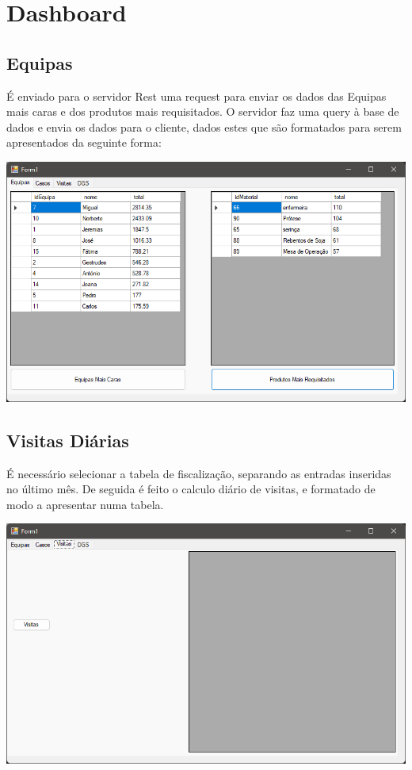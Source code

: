 \chapter{Dashboard}

\section{Equipas}
É enviado para o servidor Rest uma request para enviar os dados das Equipas mais caras e dos produtos mais requisitados. O servidor faz uma query à base de dados e envia os dados para o cliente, dados estes que são formatados para serem apresentados da seguinte forma:

\includegraphics[scale=0.65]{imagens/EquipasDashboard.png}

\section{Visitas Diárias}

É necessário selecionar a tabela de fiscalização, separando as entradas inseridas no último mês.
De seguida é feito o calculo diário de visitas, e formatado de modo a apresentar numa tabela.

\includegraphics[scale=0.65]{imagens/VisitasDashboard.png}
\vfill
